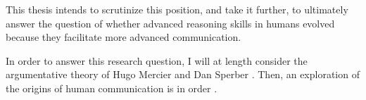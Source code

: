 
This thesis intends to scrutinize this position, and take it further, to ultimately
answer the question of whether advanced reasoning skills in humans evolved because they facilitate more advanced communication.

In order to answer this research question, I will at length consider the argumentative theory of Hugo Mercier and Dan Sperber \citep{MS11, Mercier16, MS17}. Then, an exploration of the origins of human communication is in order \citep{Tomasello08-origins, Moore17, Scott-Phillips17-pragmatics, Scott-Phillips18-communication, Benitez21}.
